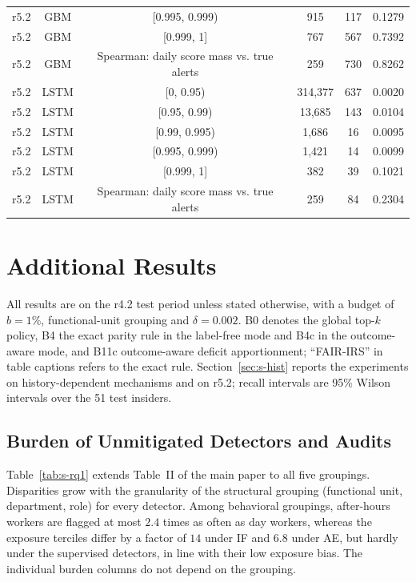 \documentclass[10pt,onecolumn,letterpaper]{article}
\begin{document}
\begin{table}[!t]
{\begin{tabular}{lccccc}
r5.2 & GBM & [0.995, 0.999) & 915 & 117 & 0.1279 \\
r5.2 & GBM & [0.999, 1] & 767 & 567 & 0.7392 \\
r5.2 & GBM & Spearman: daily score mass vs. true alerts & 259 & 730 & 0.8262 \\
r5.2 & LSTM & [0, 0.95) & 314,377 & 637 & 0.0020 \\
r5.2 & LSTM & [0.95, 0.99) & 13,685 & 143 & 0.0104 \\
r5.2 & LSTM & [0.99, 0.995) & 1,686 & 16 & 0.0095 \\
r5.2 & LSTM & [0.995, 0.999) & 1,421 & 14 & 0.0099 \\
r5.2 & LSTM & [0.999, 1] & 382 & 39 & 0.1021 \\
r5.2 & LSTM & Spearman: daily score mass vs. true alerts & 259 & 84 & 0.2304 \\
\bottomrule
\end{tabular}}
\end{table}

\section{Additional Results}
\label{sec:s-results}
All results are on the r4.2 test period unless stated otherwise, with a budget of $b=1\%$, functional-unit grouping and $\delta=0.002$. B0 denotes the global top-$k$ policy, B4 the exact parity rule in the label-free mode and B4c in the outcome-aware mode, and B11c outcome-aware deficit apportionment; ``FAIR-IRS'' in table captions refers to the exact rule. Section~\ref{sec:s-hist} reports the experiments on history-dependent mechanisms and on r5.2; recall intervals are 95\% Wilson intervals over the 51 test insiders.

\subsection{Burden of Unmitigated Detectors and Audits}
Table~\ref{tab:s-rq1} extends Table~II of the main paper to all five groupings. Disparities grow with the granularity of the structural grouping (functional unit, department, role) for every detector. Among behavioral groupings, after-hours workers are flagged at most $2.4$ times as often as day workers, whereas the exposure terciles differ by a factor of $14$ under IF and $6.8$ under AE, but hardly under the supervised detectors, in line with their low exposure bias. The individual burden columns do not depend on the grouping.
\end{document}
